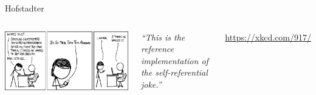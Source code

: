 
\begin{frame}[t,plain]
\titlepage
\end{frame}


\begin{frame}{Hofstadter}
%
\begin{columns}
\begin{center}
\includegraphics[width=\linewidth]{./gfx/02-xkcd-hofstadter}\\
\end{center}
%
\small
	\emph{\enquote{This is the reference implementation of the self-referential joke.}}

	\vspace{6pt}
	\url{https://xkcd.com/917/}
\end{columns}
%
\end{frame}


